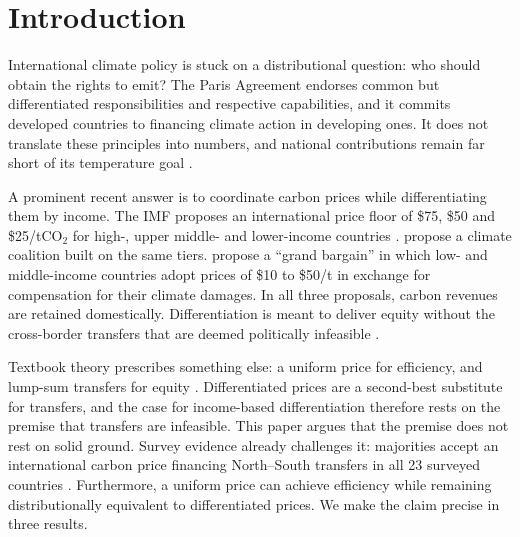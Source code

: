 \documentclass[12pt,english]{article}
\theoremstyle{remark}
\begin{document}
\section{Introduction}
\label{sec:intro}

International climate policy is stuck on a distributional question: who should obtain the rights to emit? The Paris Agreement endorses common but differentiated responsibilities and respective capabilities, and it commits developed countries to financing climate action in developing ones. It does not translate these principles into numbers, and national contributions remain far short of its temperature goal \citep{unep_emissions_2025}.

A prominent recent answer is to coordinate carbon prices while differentiating them by income. The IMF proposes an international price floor of \$75, \$50 and \$25/tCO$_2$ for high-, upper middle- and lower-income countries \citep{parry_proposal_2021}. \citet{wolfram_building_2025} propose a climate coalition built on the same tiers. \citet{banerjee_grand_2025} propose a ``grand bargain'' in which low- and middle-income countries adopt prices of \$10 to \$50/t in exchange for compensation for their climate damages. In all three proposals, carbon revenues are retained domestically. Differentiation is meant to deliver equity without the cross-border transfers that are deemed politically infeasible \citep{parry_proposal_2021}.

Textbook theory prescribes something else: a uniform price for efficiency, and lump-sum transfers for equity \citep{aldy_promise_2012}. Differentiated prices are a second-best substitute for transfers, and the case for income-based differentiation therefore rests on the premise that transfers are infeasible. This paper argues that the premise does not rest on solid ground. Survey evidence already challenges it: majorities accept an international carbon price financing North--South transfers in all 23 surveyed countries \citep{fabre_majority_2025,fabre_public_2025}. %
Furthermore, a uniform price can achieve efficiency while remaining 
distributionally equivalent to differentiated prices. We make the claim precise in three results.
\end{document}
